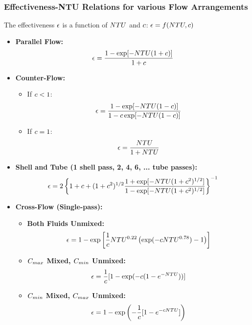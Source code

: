 \subsubsection*{Effectiveness-NTU Relations for various Flow Arrangements}
The effectiveness $\epsilon$ is a function of $NTU$ and $c$: $\epsilon = f(NTU, c)$

\begin{itemize}
    \item \textbf{Parallel Flow:}
    \begin{equation}
        \epsilon = \frac{1 - \exp[-NTU(1 + c)]}{1 + c}
    \end{equation}

    \item \textbf{Counter-Flow:}
    \begin{itemize}
        \item If $c < 1$:
        \begin{equation}
            \epsilon = \frac{1 - \exp[-NTU(1 - c)]}{1 - c \exp[-NTU(1 - c)]}
        \end{equation}
        \item If $c = 1$:
        \begin{equation}
            \epsilon = \frac{NTU}{1 + NTU}
        \end{equation}
    \end{itemize}

    \item \textbf{Shell and Tube (1 shell pass, 2, 4, 6, ... tube passes):}
    \begin{equation}
        \epsilon = 2 \left\{ 1 + c + (1 + c^2)^{1/2} \frac{1 + \exp[-NTU(1 + c^2)^{1/2}]}{1 - \exp[-NTU(1 + c^2)^{1/2}]} \right\}^{-1}
    \end{equation}

    \item \textbf{Cross-Flow (Single-pass):}
    \begin{itemize}
        \item \textbf{Both Fluids Unmixed:}
        \begin{equation}
            \epsilon = 1 - \exp \left[ \frac{1}{c} NTU^{0.22} \left( \exp(-c NTU^{0.78}) - 1 \right) \right]
        \end{equation}
        \item \textbf{$C_{max}$ Mixed, $C_{min}$ Unmixed:}
        \begin{equation}
            \epsilon = \frac{1}{c} [1 - \exp(-c(1 - e^{-NTU}))]
        \end{equation}
        \item \textbf{$C_{min}$ Mixed, $C_{max}$ Unmixed:}
        \begin{equation}
            \epsilon = 1 - \exp \left( -\frac{1}{c} [1 - e^{-c NTU}] \right)
        \end{equation}
    \end{itemize}
\end{itemize}

